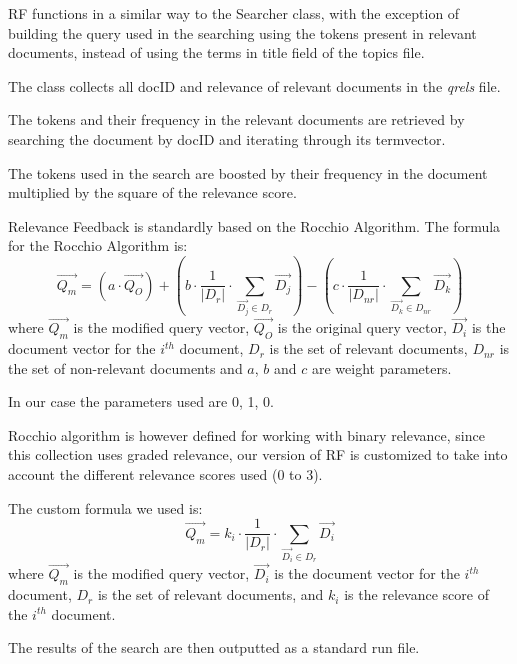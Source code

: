         RF functions in a similar way to the Searcher class, with the exception of building the query used in the searching using the tokens present in relevant documents, instead of using the terms in title field of the topics file.
        
        The class collects all docID and relevance of relevant documents in the \textit{qrels} file.
        
        The tokens and their frequency in the relevant documents are retrieved by searching the document by docID and iterating through its termvector.
        
        The tokens used in the search are boosted by their frequency in the document multiplied by the square of the relevance score.
        
        Relevance Feedback is standardly based on the Rocchio Algorithm.
        The formula for the Rocchio Algorithm is:
        $$
        \overrightarrow{Q_{m}}=
        \left(a\cdot\overrightarrow{Q_{O}}\right)+
        \left(b\cdot\frac{1}{|D_{r}|}\cdot\sum_{\overrightarrow{D_{j}}\in D_{r}}\overrightarrow{D_{j}}\right)-
        \left(c\cdot\frac{1}{|D_{nr}|}\cdot\sum_{\overrightarrow{D_{k}}\in D_{nr}}\overrightarrow{D_{k}}\right)
        $$
        where $\overrightarrow{Q_{m}}$ is the modified query vector, $\overrightarrow{Q_{O}}$ is the original query vector, $\overrightarrow{D_{i}}$ is the document vector for the $i^{th}$ document, $D_{r}$ is the set of relevant documents, $D_{nr}$ is the set of non-relevant documents and $a$, $b$ and $c$ are weight parameters.
        
        In our case the parameters used are 0, 1, 0.
        
        Rocchio algorithm is however defined for working with binary relevance, since this collection uses graded relevance, our version of RF is customized to take into account the different relevance scores used (0 to 3).
        
        The custom formula we used is:
        $$
        \overrightarrow{Q_{m}}=
        k_i\cdot\frac{1}{|D_{r}|}\cdot\sum_{\overrightarrow{D_{i}}\in D_{r}}\overrightarrow{D_{i}}
        $$
        where $\overrightarrow{Q_{m}}$ is the modified query vector, $\overrightarrow{D_{i}}$ is the document vector for the $i^{th}$ document, $D_{r}$ is the set of relevant documents, and $k_i$ is the relevance score of the $i^{th}$ document.
        
        The results of the search are then outputted as a standard run file.
        
